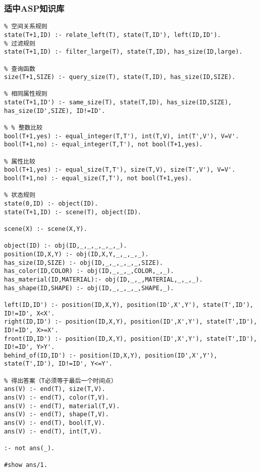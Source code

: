\subsubsection{适中ASP知识库}
\begin{lstlisting}
% 空间关系规则
state(T+1,ID) :- relate_left(T), state(T,ID'), left(ID,ID').
% 过滤规则
state(T+1,ID) :- filter_large(T), state(T,ID), has_size(ID,large).

% 查询函数
size(T+1,SIZE) :- query_size(T), state(T,ID), has_size(ID,SIZE).

% 相同属性规则
state(T+1,ID') :- same_size(T), state(T,ID), has_size(ID,SIZE), has_size(ID',SIZE), ID!=ID'.

% % 整数比较
bool(T+1,yes) :- equal_integer(T,T'), int(T,V), int(T',V'), V=V'.
bool(T+1,no) :- equal_integer(T,T'), not bool(T+1,yes).

% 属性比较
bool(T+1,yes) :- equal_size(T,T'), size(T,V), size(T',V'), V=V'.
bool(T+1,no) :- equal_size(T,T'), not bool(T+1,yes).

% 状态规则
state(0,ID) :- object(ID).
state(T+1,ID) :- scene(T), object(ID).

scene(X) :- scene(X,Y).

object(ID) :- obj(ID,_,_,_,_,_,_).
position(ID,X,Y) :- obj(ID,X,Y,_,_,_,_).
has_size(ID,SIZE) :- obj(ID,_,_,_,_,_,SIZE).
has_color(ID,COLOR) :- obj(ID,_,_,_,COLOR,_,_).
has_material(ID,MATERIAL):- obj(ID,_,_,MATERIAL,_,_,_).
has_shape(ID,SHAPE) :- obj(ID,_,_,_,_,SHAPE,_).

left(ID,ID') :- position(ID,X,Y), position(ID',X',Y'), state(T',ID'), ID!=ID', X<X'.
right(ID,ID') :- position(ID,X,Y), position(ID',X',Y'), state(T',ID'), ID!=ID', X>=X'.
front(ID,ID') :- position(ID,X,Y), position(ID',X',Y'), state(T',ID'), ID!=ID', Y>Y'.
behind_of(ID,ID') :- position(ID,X,Y), position(ID',X',Y'), state(T',ID'), ID!=ID', Y<=Y'.

% 得出答案（T必须等于最后一个时间点）
ans(V) :- end(T), size(T,V).
ans(V) :- end(T), color(T,V).
ans(V) :- end(T), material(T,V).
ans(V) :- end(T), shape(T,V).
ans(V) :- end(T), bool(T,V).
ans(V) :- end(T), int(T,V).

:- not ans(_).

#show ans/1.
\end{lstlisting}
